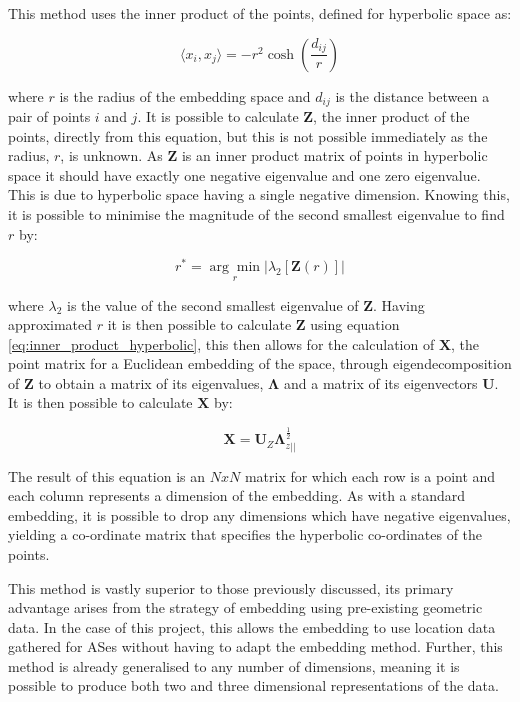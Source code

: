 This method uses the inner product of the points, defined for hyperbolic space as: 

\begin{equation}
\label{eq:inner_product_hyperbolic}
\langle x_i,x_j\rangle = -r^2\cosh \left(\frac{d_{ij}}{r}\right)
\end{equation}

where $r$ is the radius of the embedding space and $d_{ij}$ is the distance between a pair of points $i$ and $j$. It is possible to calculate $\boldsymbol{Z}$, the inner product of the points, directly from this equation, but this is not possible immediately as the radius, $r$, is unknown. As $\boldsymbol{Z}$ is an inner product matrix of points in hyperbolic space it should have exactly one negative eigenvalue and one zero eigenvalue. This is due to hyperbolic space having a single negative dimension. Knowing this, it is possible to minimise the magnitude of the second smallest eigenvalue to find $r$ by:

\begin{equation}
\label{eq:argmin_hyperbolic}
r^*=\underset{r}{\arg\min}|\lambda_2[\boldsymbol{Z}(r)]|
\end{equation}

where $\lambda_2$ is the value of the second smallest eigenvalue of $\boldsymbol{Z}$. Having approximated $r$ it is then possible to calculate $\boldsymbol{Z}$ using equation \ref{eq:inner_product_hyperbolic}, this then allows for the calculation of $\boldsymbol{X}$, the point matrix for a Euclidean embedding of the space, through eigendecomposition of $\boldsymbol{Z}$ to obtain a matrix of its eigenvalues, $\boldsymbol{\Lambda}$ and a matrix of its eigenvectors $\boldsymbol{U}$. It is then possible to calculate $\boldsymbol{X}$ by:

\begin{equation}
\label{eq:embedding_x}
\boldsymbol{X}=\boldsymbol{U}_Z\boldsymbol{\Lambda}_{z||}^{\frac{1}{2}}
\end{equation}

The result of this equation is an $NxN$ matrix for which each row is a point and each column represents a dimension of the embedding. As with a standard embedding, it is possible to drop any dimensions which have negative eigenvalues, yielding a co-ordinate matrix that specifies the hyperbolic co-ordinates of the points.

This method is vastly superior to those previously discussed, its primary advantage arises from the strategy of embedding using pre-existing geometric data. In the case of this project, this allows the embedding to use location data gathered for ASes without having to adapt the embedding method. Further, this method is already generalised to any number of dimensions, meaning it is possible to produce both two and three dimensional representations of the data. 


